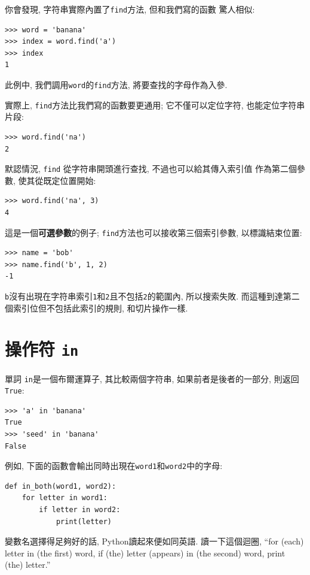 \documentclass[10pt]{book}
\begin{document}
你會發現, 字符串實際內置了{\tt find}方法, 但和我們寫的函數
驚人相似:

\begin{verbatim}
>>> word = 'banana'
>>> index = word.find('a')
>>> index
1
\end{verbatim}
%
此例中, 我們調用{\tt word}的{\tt find}方法, 將要查找的字母作為入參. 

實際上, {\tt find}方法比我們寫的函數要更通用;
它不僅可以定位字符, 也能定位字符串片段:

\begin{verbatim}
>>> word.find('na')
2
\end{verbatim}
%
默認情況, {\tt find} 從字符串開頭進行查找, 不過也可以給其傳入索引值
作為第二個參數, 
使其從既定位置開始:

\begin{verbatim}
>>> word.find('na', 3)
4
\end{verbatim}
%
這是一個{\bf 可選參數}的例子;
{\tt find}方法也可以接收第三個索引參數, 以標識結束位置:

\begin{verbatim}
>>> name = 'bob'
>>> name.find('b', 1, 2)
-1
\end{verbatim}
%
{\tt b}沒有出現在字符串索引{\tt 1}和{\tt 2}且不包括{\tt 2}的範圍內, 
所以搜索失敗. 
而這種到達第二個索引位但不包括此索引的規則, 和切片操作一樣. 


\section{操作符 {\tt in}}
\label{inboth}

單詞 {\tt in}是一個布爾運算子, 其比較兩個字符串, 
如果前者是後者的一部分, 
則返回{\tt True}:

\begin{verbatim}
>>> 'a' in 'banana'
True
>>> 'seed' in 'banana'
False
\end{verbatim}
%
例如, 下面的函數會輸出同時出現在{\tt word1}和{\tt word2}中的字母:

\begin{verbatim}
def in_both(word1, word2):
    for letter in word1:
        if letter in word2:
            print(letter)
\end{verbatim}
%

變數名選擇得足夠好的話, Python讀起來便如同英語. 
讀一下這個迴圈, ``for (each) letter in (the first) word, if (the) letter 
(appears) in (the second) word, print (the) letter.''
\end{document}
